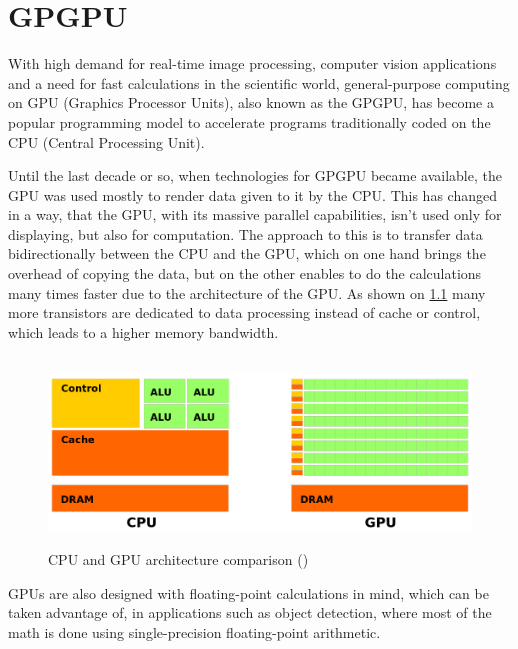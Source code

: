 \chapter{GPGPU}

With high demand for real-time image processing, computer vision applications and a need for fast calculations in the scientific world, general-purpose computing on GPU (Graphics Processor Units), also known as the GPGPU, has become a popular programming model to accelerate programs traditionally coded on the CPU (Central Processing Unit).

Until the last decade or so, when technologies for GPGPU became available, the GPU was used mostly to render data given to it by the CPU. This has changed in a way, that the GPU, with its massive parallel capabilities, isn't used only for displaying, but also for computation. The approach to this is to transfer data bidirectionally between the CPU and the GPU, which on one hand brings the overhead of copying the data, but on the other enables to do the calculations many times faster due to the architecture of the GPU. As shown on \ref{fig:cpu-gpu} many more transistors are dedicated to data processing instead of cache or control, which leads to a higher memory bandwidth.

\begin{center}
\begin{figure}[h]
	\centering\includegraphics[height=5cm]{fig/cpu-gpu.png}
	\caption{CPU and GPU architecture comparison (\cite{cuda-toolkit-docs})}
	\label{fig:cpu-gpu}
\end{figure}
\end{center}

GPUs are also designed with floating-point calculations in mind, which can be taken advantage of, in applications such as object detection, where most of the math is done using single-precision floating-point arithmetic.

